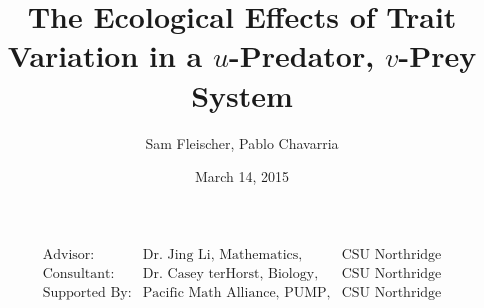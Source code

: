 \documentclass[10pt]{beamer}
\title{The Ecological Effects of Trait Variation in a $u$-Predator, $v$-Prey System}
\author{Sam Fleischer, Pablo Chavarria}
\date{March 14, 2015}
\begin{document}
\begin{frame}
	\titlepage
	\begin{align*}
		\begin{array}{lll}
		\text{Advisor:} & \text{Dr. Jing Li, Mathematics,} & \text{CSU Northridge} \\
		\text{Consultant:} & \text{Dr. Casey terHorst, Biology,} & \text{CSU Northridge} \\
		\text{Supported By:} & \text{Pacific Math Alliance, PUMP,} & \text{CSU Northridge}
		\end{array}
	\end{align*}
\end{frame}

\end{document}
